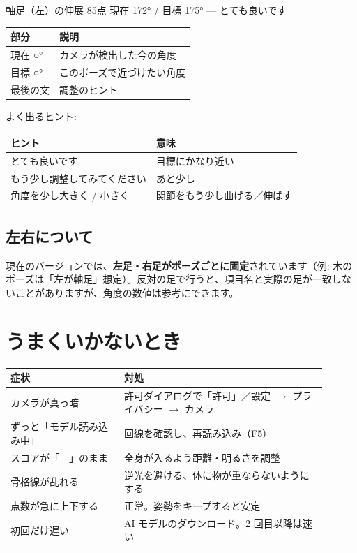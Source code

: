 \documentclass[a4paper,11pt]{ltjsarticle}
\begin{document}
\begin{asciibox}
軸足（左）の伸展          85点
現在 172° / 目標 175° — とても良いです
\end{asciibox}

\begin{table}[h]
  \centering
  \begin{tabular}{@{}ll@{}}
    \toprule
    部分 & 説明 \\
    \midrule
    現在 ○° & カメラが検出した今の角度 \\
    目標 ○° & このポーズで近づけたい角度 \\
    最後の文 & 調整のヒント \\
    \bottomrule
  \end{tabular}
\end{table}

よく出るヒント:

\begin{table}[h]
  \centering
  \begin{tabular}{@{}ll@{}}
    \toprule
    ヒント & 意味 \\
    \midrule
    とても良いです & 目標にかなり近い \\
    もう少し調整してみてください & あと少し \\
    角度を少し大きく / 小さく & 関節をもう少し曲げる／伸ばす \\
    \bottomrule
  \end{tabular}
\end{table}

\subsection{左右について}

現在のバージョンでは、\textbf{左足・右足がポーズごとに固定}されています（例: 木のポーズは「左が軸足」想定）。反対の足で行うと、項目名と実際の足が一致しないことがありますが、角度の数値は参考にできます。

\section{うまくいかないとき}

\begin{table}[h]
  \centering
  \small
  \begin{tabular}{@{}p{0.32\linewidth}p{0.58\linewidth}@{}}
    \toprule
    症状 & 対処 \\
    \midrule
    カメラが真っ暗 & 許可ダイアログで「許可」／設定 $\to$ プライバシー $\to$ カメラ \\
    ずっと「モデル読み込み中」 & 回線を確認し、再読み込み（F5） \\
    スコアが「---」のまま & 全身が入るよう距離・明るさを調整 \\
    骨格線が乱れる & 逆光を避ける、体に物が重ならないようにする \\
    点数が急に上下する & 正常。姿勢をキープすると安定 \\
    初回だけ遅い & AI モデルのダウンロード。2 回目以降は速い \\
    \bottomrule
  \end{tabular}
\end{table}
\end{document}
